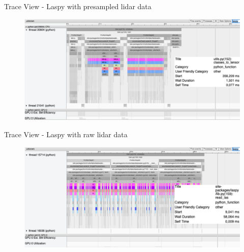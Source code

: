 \documentclass[compress,aspectratio=169]{beamer}
\begin{document}
\begin{frame}{Trace View - Laspy with presampled lidar data}
    \vspace{-1em}
\begin{center}
    \begin{figure}
        \includegraphics[width=1\textwidth]{../../data/scap_gtx1080_profiler-torch_batch-size-64_14650758_trace-view-laspy}
    \end{figure}
    \end{center}
\end{frame}

\begin{frame}{Trace View - Laspy with raw lidar data}
    \vspace{-1em}
\begin{center}
    \begin{figure}
        \includegraphics[width=1\textwidth]{../../data/scap_gtx1080_profiler-torch_sample-points_14650750_trace-view-laspy}
    \end{figure}
    \end{center}
\end{frame}
\end{document}
